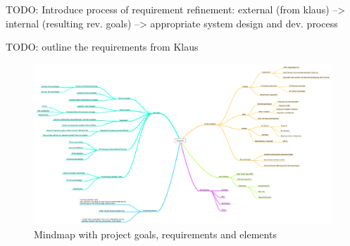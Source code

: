 TODO: Introduce process  of requirement refinement: external (from klaus) --> internal (resulting rev. goals) --> appropriate system design and dev. process

TODO: outline the requirements from Klaus

\begin{figure}[h!]
\centering
\includegraphics[width=16cm]{pics/kangaroo.png}
\caption{Mindmap with project goals, requirements and elements}
\label{mindmap}
\end{figure}